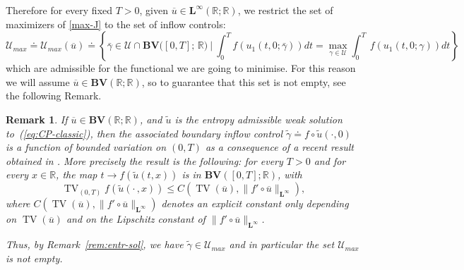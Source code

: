 \documentclass[a4paper, 10pt, final]{article}
\newtheorem{remark}{Remark}[section]
\newcommand{\R}{\mathbb{R}} \newcommand{\N}{\mathbb{N}}
\newcommand{\LL}[1]{\mathbf{L^{#1}}}
\newcommand{\BV}{\mathbf{BV}}
\newcommand{\maurotx}[1]{{\color{blue} [Mauro]: {#1}}}
\DeclareMathOperator{\tv}{TV}
\begin{document}
Therefore for every fixed $T>0$, given $\overline u\in 
  \mathbf{L}^\infty(\R;\R)$,
we restrict   the set  of maximizers of \eqref{max-J} to the  set  of inflow controls: 
\begin{equation}
    \label{eq:admiscontolset-max}
    \mathcal{U}_{max} 
  \doteq \mathcal{U}_{max}(\overline u)
  \doteq \left\{ \bar \gamma\in \mathcal{U}\cap 
  \mathbf{BV}   
 \big([0,T];\, \R \big)\ \bigg|\ \int_0^T f(u_1(t, 0;\bar\gamma)) dt
  = \max_{\gamma \in {\mathcal{U}}} \int_0^T \ f(u_1(t, 0;\gamma)) dt\right\}
\end{equation}
which are admissible for the functional we are going to minimise. For this reason we will assume  $\overline u\in 
  \mathbf{BV}(\R;\R)$, so to guarantee that this set is not empty, see the following Remark. 
   
  


  

% 

\begin{remark}\upshape 
\label{rem:entr-sol-bv}
If $\overline u\in 
  \mathbf{BV}(\R; \R)$,
  and $\widetilde u$ is the 
entropy admissible weak solution
to~(\ref{eq:CP-classic}),
  then the associated  boundary inflow control
  $\widetilde\gamma\doteq f\circ \widetilde u (\cdot, 0)$ is a function of bounded variation on $(0,T)$ 
  as a consequence of a recent result obtained   in \cite[Theorem 1.1]{marconi1}. 
  More precisely the result   is the following: for every $T>0$ and for every $x\in\R$,     
  the map $t\to f(\widetilde u(t , x))$ is in 
 $ \mathbf{BV}([0,T]; \R)$, with 
 \begin{equation}\label{stimabv} 
  \tv_{(0, T)} f(\widetilde u(\cdot\,, x))\leq C(\tv(\overline u), \|f'\circ\overline u\|_{\LL{\infty}}),
 \end{equation}
 where $C(\tv(\overline u), \|f'\circ\overline u\|_{\LL\infty})$ denotes an explicit constant only depending on $\tv(\overline u) $ and on
the Lipschitz constant of $\|f'\circ\overline u\|_{\LL\infty}$. 


Thus, by Remark~\ref{rem:entr-sol}, we have
  $\widetilde\gamma\in \mathcal{U}_{max}$ 
and in particular  the set $\mathcal{U}_{max}$ is not empty.
\end{remark}
\end{document}
